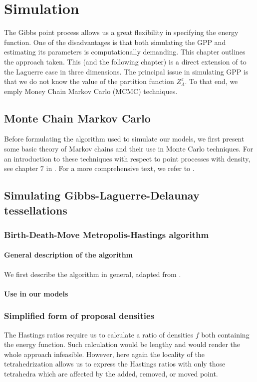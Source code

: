 \chapter{Simulation}
The Gibbs point process allows us a great flexibility in specifying the energy function. One of the disadvantages is that both simulating the GPP and estimating its parameters is computationally demanding. This chapter outlines the approach taken. This (and the following chapter) is a direct extension of \cite{DereudreLavancier2010} to the Laguerre case in three dimensions.
The principal issue in simulating GPP is that we do not know the value of the partition function $Z^z_\Lambda$. To that end, we emply Money Chain Markov Carlo (MCMC) techniques.
\section{Monte Chain Markov Carlo}
Before formulating the algorithm used to simulate our models, we first present some basic theory of Markov chains and their use in Monte Carlo techniques. For an introduction to these techniques with respect to point processes with density, see chapter $7$ in \cite{MollerWaagepetersen2003}. For a more comprehensive text, we refer to \cite{MeynTweedie1993}.

\tbd

\section{Simulating Gibbs-Laguerre-Delaunay tessellations}
\subsection{Birth-Death-Move Metropolis-Hastings algorithm}
\subsubsection{General description of the algorithm}
We first describe the algorithm in general, adapted from \cite{MollerWaagepetersen2003}.
\tbd

\subsubsection{Use in our models}

\subsection{Simplified form of proposal densities}
The Hastings ratios require us to calculate a ratio of densities $f$ both containing the energy function. Such calculation would be lengthy and would render the whole approach infeasible. However, here again the locality of the tetrahedrization allows us to express the Hastings ratios with only those tetrahedra which are affected by the added, removed, or moved point.


